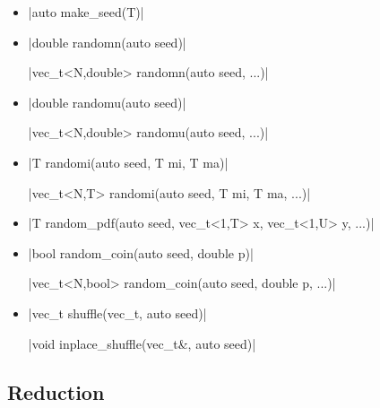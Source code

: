 \documentclass[12pt]{report}
\begin{document}
\begin{itemize}
\item \cppinline|auto make_seed(T)| 

\item \cppinline|double randomn(auto seed)| 

\cppinline|vec_t<N,double> randomn(auto seed, ...)|

\item \cppinline|double randomu(auto seed)| 

\cppinline|vec_t<N,double> randomu(auto seed, ...)|

\item \cppinline|T randomi(auto seed, T mi, T ma)| 

\cppinline|vec_t<N,T> randomi(auto seed, T mi, T ma, ...)|

\item \cppinline|T random_pdf(auto seed, vec_t<1,T> x, vec_t<1,U> y, ...)| 

\item \cppinline|bool random_coin(auto seed, double p)| 

\cppinline|vec_t<N,bool> random_coin(auto seed, double p, ...)|

\item \cppinline|vec_t shuffle(vec_t, auto seed)| 

\cppinline|void inplace_shuffle(vec_t&, auto seed)| 
\end{itemize}

\subsection{Reduction}
\end{document}
